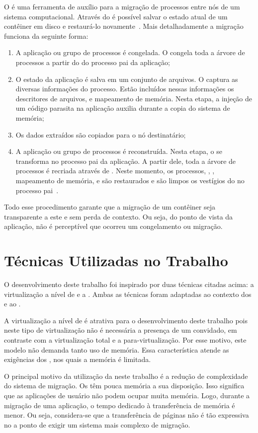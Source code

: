 O \criu é uma ferramenta de auxílio para a migração de processos entre nós de um sistema computacional. Através do \criu é possível salvar o estado atual de um contêiner em disco e restaurá-lo novamente~\cite{venkatesh2019fast}. Mais detalhadamente a migração funciona da seguinte forma:
\begin{enumerate}[label=(\roman*)]
    \item A aplicação ou grupo de processos é congelada. O \criu congela toda a árvore de processos a partir do \pid do processo pai da aplicação;
    \item O estado da aplicação é salva em um conjunto de arquivos. O \criu captura as diversas informações do processo. Estão incluídos nessas informações os descritores de arquivos, \pipes e mapeamento de memória. Nesta etapa, a injeção de um código parasita na aplicação auxilia durante a copia do sistema de memória;
    \item Os dados extraídos são copiados para o nó destinatário;
    \item A aplicação ou grupo de processos é reconstruída. Nesta etapa, o \criu se transforma no processo pai da aplicação. A partir dele, toda a árvore de processos é recriada através de \forks. Neste momento, os processos, \namespaces, \cgroups, mapeamento de memória, \timers e \threads são restaurados e são limpos os vestígios do \criu no processo pai~\cite{dash2022understanding}.
\end{enumerate}

Todo esse procedimento garante que a migração de um contêiner seja transparente a este e sem perda de contexto. Ou seja, do ponto de vista da aplicação, não é perceptível que ocorreu um congelamento ou migração.



\section{Técnicas Utilizadas no Trabalho}

O desenvolvimento deste trabalho foi inspirado por duas técnicas citadas acima: a virtualização a nível de \so e a \precopymigration. Ambas as técnicas foram adaptadas ao contexto dos \lws e ao \nanvix.

A virtualização a nível de \so é atrativa para o desenvolvimento deste trabalho pois neste tipo de virtualização não é necessária a presença de um \so convidado, em contraste com a virtualização total e a para-virtualização. Por esse motivo, este modelo não demanda tanto uso de memória. Essa característica atende as exigências dos \lws, nos quais a memória é limitada.

O principal motivo da utilização da \precopymigration neste trabalho é a redução de complexidade do sistema de migração. Os \lws têm pouca memória a sua disposição. Isso significa que as aplicações de usuário não podem ocupar muita memória. Logo, durante a migração de uma aplicação, o tempo dedicado à transferência de memória é menor. Ou seja, considera-se que a transferência de páginas não é tão expressiva no \downtime a ponto de exigir um sistema mais complexo de migração.



